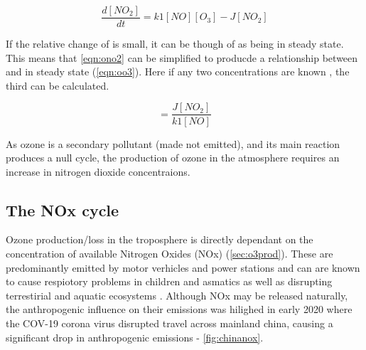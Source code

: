 \begin{equation}
  \frac{d[NO_2]}{dt} = k1[NO][O_3] - J[NO_2]
  \label{eqn:ono2}
\end{equation}

If the relative change of  is small, it can be though of as being in steady state. This means that \autoref{eqn:ono2} can be simplified to producde a relationship between  and  in steady state (\autoref{eqn:oo3}). Here if any two concentrations are known , the third can be calculated.

\begin{equation}
  [O_3] = \frac{J[NO_2]}{k1[NO]}
  \label{eqn:oo3}
\end{equation}

As ozone is a secondary pollutant (made not emitted), and its main reaction produces a null cycle, the production of ozone in the atmosphere requires an increase in nitrogen dioxide concentraions.

%
\subsection{The NOx cycle}\label{sec:noxcycle}
Ozone production/loss in the troposphere is directly dependant on the concentration of available Nitrogen Oxides (NOx) (\autoref{sec:o3prod}). These are predominantly emitted by motor verhicles and power stations and can are known to cause respiotory problems in children and asmatics as well as disrupting terrestirial and aquatic ecosystems \citep{eea}. Although NOx may be released naturally, the anthropogenic influence on their emissions was hilighed in early 2020 where the COV-19 corona virus disrupted travel across mainland china, causing a significant drop in anthropogenic emissions - \autoref{fig:chinanox}.

